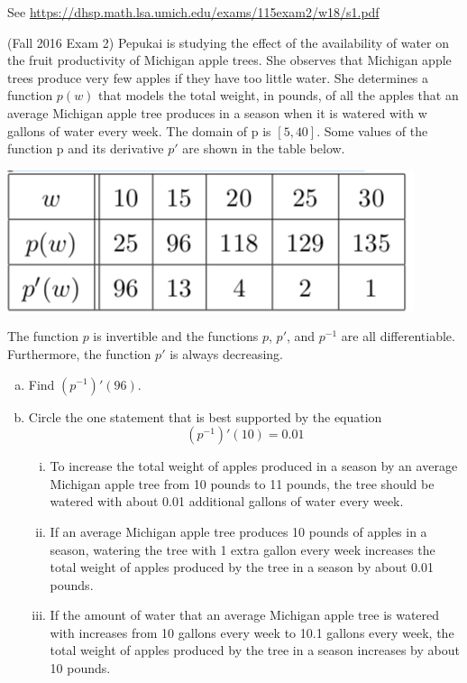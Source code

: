 \documentclass[11pt]{exam}
\begin{document}
\begin{questions}
\begin{solution}
  See \href{https://dhsp.math.lsa.umich.edu/exams/115exam2/w18/s1.pdf}{https://dhsp.math.lsa.umich.edu/exams/115exam2/w18/s1.pdf}
\end{solution}
\question (Fall 2016 Exam 2) %
  Pepukai is studying the effect of the availability of water on the fruit productivity of Michigan apple trees. She observes that Michigan apple trees produce very few apples if they have too little water. She determines a function $p(w)$ that models the total weight, in pounds, of all the apples that an average Michigan apple tree produces in a season when it is watered with w gallons of water every week. The domain of p is $[5, 40]$. Some values of the function p and its derivative $p'$ are shown in the table below.
  \begin{center}
    \includegraphics[scale=0.35]{table3.png}
  \end{center}
	The function \(p\) is invertible and the functions $p$, $p'$, and $p^{-1}$ are all differentiable. Furthermore, the function $p'$ is always decreasing.
	\begin{enumerate}[(a)]
	\item Find $(p^{-1})'(96)$.
	\item Circle the one statement that is best supported by the equation
	$$(p^{-1})'(10) = 0.01$$
	\begin{enumerate}[(i)]
	\item To increase the total weight of apples produced in a season by an average Michigan apple tree from 10 pounds to 11 pounds, the tree should be watered with about 0.01 additional gallons of water every week.
	\item If an average Michigan apple tree produces 10 pounds of apples in a season, watering the tree with 1 extra gallon every week increases the total weight of apples produced by the tree in a season by about 0.01 pounds.
	\item If the amount of water that an average Michigan apple tree is watered with increases from 10 gallons every week to 10.1 gallons every week, the total weight of apples produced by the tree in a season increases by about 10 pounds.

\end{enumerate}
\end{enumerate}
\end{questions}
\end{document}
